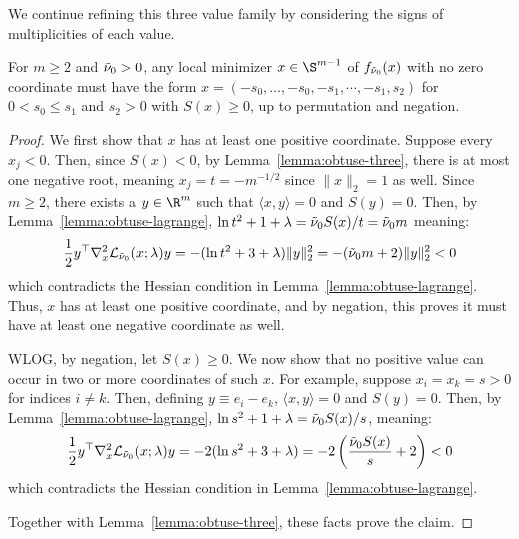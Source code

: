 \documentclass[11pt]{article}
\begin{document}
We continue refining this three value family by considering the signs of multiplicities of each value. 
\begin{lemma}\label{lemma:obtuse-shape}
    For $m\geq 2 $ and ${\Tilde \nu_0}>0$, any local minimizer $x\in \S^{m-1}$ of $f_{{\Tilde \nu_0}}(x)$ with no zero coordinate must have the form $x=(-s_0,\dots,-s_0,-s_1,\cdots,-s_1,s_2)$ for $0<s_0\leq s_1$ and $s_2>0$ with $S(x)\geq 0$, up to permutation and negation. 
\end{lemma}
\begin{proof}
We first show that $x$ has at least one positive coordinate. Suppose every $x_j<0$. Then, since $S(x)<0$, by Lemma~\ref{lemma:obtuse-three}, there is at most one negative root, meaning $x_j=t=-m^{-1/2}$ since $\|x\|_2=1$ as well. Since $m\geq 2$, there exists a $y\in \R^m$ such that $\langle x,y\rangle =0$ and $S(y)=0$. Then, by Lemma~\ref{lemma:obtuse-lagrange}, $\ln t^2 + 1+\lambda ={\Tilde \nu_0}S(x)/t={\Tilde \nu_0}m$ meaning:
\begin{equation}
        \frac 1 2 y^\top \nabla^2_x \mathcal L _{{\Tilde \nu_0}}(x;\lambda)y=-(\ln t^2+3+\lambda)\|y\|_2^2 =-({\Tilde \nu_0}m+2)\|y\|_2^2<0
\end{equation}
which contradicts the Hessian condition in Lemma~\ref{lemma:obtuse-lagrange}. Thus, $x$ has at least one positive coordinate, and by negation, this proves it must have at least one negative coordinate as well. 

WLOG, by negation, let $S(x)\geq 0$. We now show that no positive value can occur in two or more coordinates of such $x$. For example, suppose $x_i=x_k=s>0$ for indices $i\neq k$. Then, defining $y\equiv e_i-e_k $, $\langle x,y\rangle=0$ and $S(y)=0$. Then, by Lemma~\ref{lemma:obtuse-lagrange}, $\ln s^2 +1+\lambda ={\Tilde \nu_0} S(x)/s$, meaning:
\begin{equation}
     \frac 1 2 y^\top \nabla^2_x \mathcal L _{{\Tilde \nu_0}}(x;\lambda)y=-2(\ln s^2+3+\lambda)=-2\left(\frac{{\Tilde \nu_0} S(x)}{s}+2\right)<0
\end{equation}
which contradicts the Hessian condition in Lemma~\ref{lemma:obtuse-lagrange}. 

Together with Lemma~\ref{lemma:obtuse-three}, these facts prove the claim. 
\end{proof}
\end{document}
